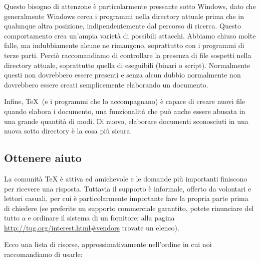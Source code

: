 \documentclass{article}
\begin{document}
Questo bisogno di attenzone è particolarmente pressante sotto Windows,
dato che generalmente Windows cerca i programmi nella directory attuale
prima che in qualunque altra posizione, indipendentemente dal percorso di
ricerca. Questo comportamento crea un'ampia varietà di possibili attacchi.
Abbiamo chiuso molte falle, ma indubbiamente alcune ne rimangono,
soprattutto con i programmi di terze parti. Perciò raccomandiamo di
controllare la presenza di file sospetti nella directory attuale,
soprattutto quella di eseguibili (binari o script). Normalmente questi non
dovrebbero essere presenti e senza alcun dubbio normalmente non dovrebbero
essere creati semplicemente elaborando un documento.

Infine, \TeX\ (e i programmi che lo accompagnano) è capace di creare nuovi
file quando elabora i documento, una funzionalità che può anche essere
abusata in una grande quantità di modi. Di nuovo, elaborare documenti
sconosciuti in una nuova sotto directory è la cosa più sicura.


\subsection{Ottenere aiuto}
\label{sec:help}

La comunità \TeX{} è attiva ed amichevole e le domande più importanti
finiscono per ricevere una risposta. Tuttavia il supporto è informale,
offerto da volontari e lettori casuali, per cui è particolarmente
importante fare la propria parte prima di chiedere (se preferite un
supporto commerciale garantito, potete rinunciare del tutto a \TL{} e
ordinare il sistema di un fornitore; alla pagina
\url{http://tug.org/interest.html#vendors} trovate un elenco).

Ecco una lista di risorse, approssimativamente nell'ordine in cui noi
raccomandiamo di usarle:
\end{document}
